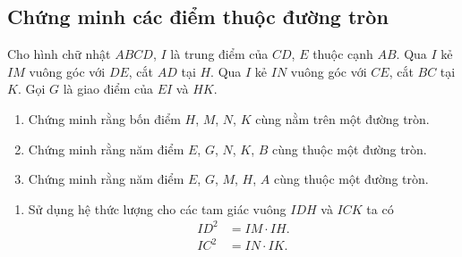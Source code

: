 \subsection*{Chứng minh các điểm thuộc đường tròn}

\begin{bt}%
 Cho hình chữ nhật $ABCD$, $I$ là trung điểm của $CD$, $E$ thuộc cạnh $AB$. Qua $I$ kẻ $IM$ vuông góc với $DE$, cắt $AD$ tại $H$. Qua $I$ kẻ $IN$ vuông góc với $CE$, cắt $BC$ tại $K$. Gọi $G$ là giao điểm của $EI$ và $HK$.
 \begin{enumerate}
  \item Chứng minh rằng bốn điểm $H$, $M$, $N$, $K$ cùng nằm trên một đường tròn.
  \item Chứng minh rằng năm điểm $E$, $G$, $N$, $K$, $B$ cùng thuộc một đường tròn.
  \item Chứng minh rằng năm điểm $E$, $G$, $M$, $H$, $A$ cùng thuộc một đường tròn.
 \end{enumerate}
 \loigiai
  {
  \begin{center}
  \end{center}
  \begin{enumerate}
   \item Sử dụng hệ thức lượng cho các tam giác vuông $IDH$ và $ICK$ ta có
   \begin{align}
    ID^2 &= IM \cdot IH. \tag{1}\\
    IC^2 &= IN \cdot IK. \tag{2}
   \end{align}

\end{enumerate}}
\end{bt}
